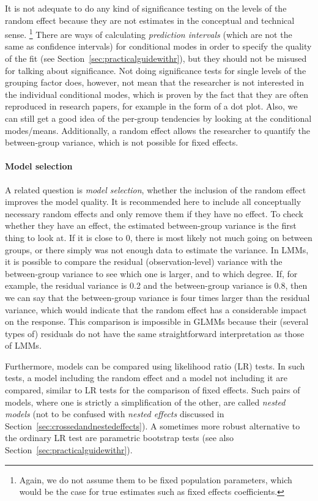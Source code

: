 It is not adequate to do any kind of significance testing on the levels of the random effect because they are not estimates in the conceptual and technical sense.%
\footnote{Again, we do not assume them to be fixed population parameters, which would be the case for true estimates such as fixed effects coefficients.}
There are ways of calculating \textit{prediction intervals} (which are not the same as confidence intervals) for conditional modes in order to specify the quality of the fit (see Section~\ref{sec:practicalguidewithr}), but they should not be misused for talking about significance.
Not doing significance tests for single levels of the grouping factor does, however, not mean that the researcher is not interested in the individual conditional modes, which is proven by the fact that they are often reproduced in research papers, for example in the form of a dot plot.
Also, we can still get a good idea of the per-group tendencies by looking at the conditional modes\slash means.
Additionally, a random effect allows the researcher to quantify the between-group variance, which is not possible for fixed effects.

\paragraph{Model selection}

A related question is \textit{model selection}, \ie whether the inclusion of the random effect improves the model quality.
It is recommended here to include all conceptually necessary random effects and only remove them if they have no effect.
To check whether they have an effect, the estimated between-group variance is the first thing to look at.
If it is close to $0$, there is most likely not much going on between groups, or there simply was not enough data to estimate the variance.
In LMMs, it is possible to compare the residual (observation-level) variance with the between-group variance to see which one is larger, and to which degree.
If, for example, the residual variance is 0.2 and the between-group variance is 0.8, then we can say that the between-group variance is four times larger than the residual variance, which would indicate that the random effect has a considerable impact on the response.
This comparison is impossible in GLMMs because their (several types of) residuals do not have the same straightforward interpretation as those of LMMs.

Furthermore, models can be compared using likelihood ratio (LR) tests.
In such tests, a model including the random effect and a model not including it are compared, similar to LR tests for the comparison of fixed effects.
Such pairs of models, where one is strictly a simplification of the other, are called \textit{nested models} (not to be confused with \textit{nested effects} discussed in Section~\ref{sec:crossedandnestedeffects}).
A sometimes more robust alternative to the ordinary LR test are parametric bootstrap tests (see also Section~\ref{sec:practicalguidewithr}).

